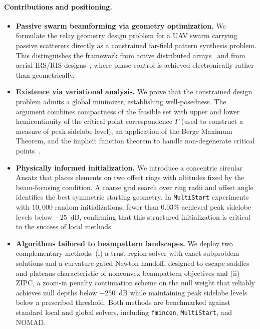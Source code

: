 \documentclass[11pt,letterpaper]{article}
\theoremstyle{definition}
\theoremstyle{plain}
\begin{document}
\paragraph{Contributions and positioning.}
\begin{itemize}
  \item \textbf{Passive swarm beamforming via geometry optimization.} We formulate the
  relay geometry design problem for a UAV swarm carrying passive scatterers directly as a
  constrained far-field pattern synthesis problem. This distinguishes the framework from active distributed arrays~\cite{Mudumbai2005_ISIT,Mudumbai2010_TIT,Nanzer2021_TMTT_Review} and from aerial IRS/RIS
  designs~\cite{Cui2024_CST_Survey,Cui2021_JSAC_UAV_IRS,Alsarayreh2023,Rahmatov2023_Survey_RISUAV}, where phase control is achieved electronically rather than geometrically.

  \item \textbf{Existence via variational analysis.} We prove that the constrained design
  problem admits a global minimizer, establishing well-posedness. The argument combines
  compactness of the feasible set with upper and lower hemicontinuity of the critical point
  correspondence $\Gamma$ (used to construct a measure of peak sidelobe level), an application of the Berge Maximum Theorem, and the implicit
  function theorem to handle non-degenerate critical points~\cite{berge63,aliprantis06}.

  \item \textbf{Physically informed initialization.} We introduce a concentric circular
  Ansatz that places elements on two offset rings with altitudes fixed by the beam-focusing
  condition. A coarse grid search over ring radii and offset angle identifies the best
  symmetric starting geometry. In \texttt{MultiStart} experiments with $10{,}000$ random
  initializations, fewer than $0.03\%$ achieved peak sidelobe levels below $-25$~dB,
  confirming that this structured initialization is critical to the success of local methods.

\item \textbf{Algorithms tailored to beampattern landscapes.} We deploy two
  complementary methods: (i) a trust-region solver with exact subproblem solutions and a
  curvature-gated Newton handoff, designed to escape saddles and plateaus characteristic of
  nonconvex beampattern objectives and (ii) ZIPC, a zoom-in penalty continuation scheme on
  the null weight that reliably achieves null depths below $-250$~dB while maintaining peak
  sidelobe levels below a prescribed threshold. Both methods are benchmarked against
  standard local and global solvers, including \texttt{fmincon}, \texttt{MultiStart}, and
  NOMAD.
\end{itemize}
\end{document}
